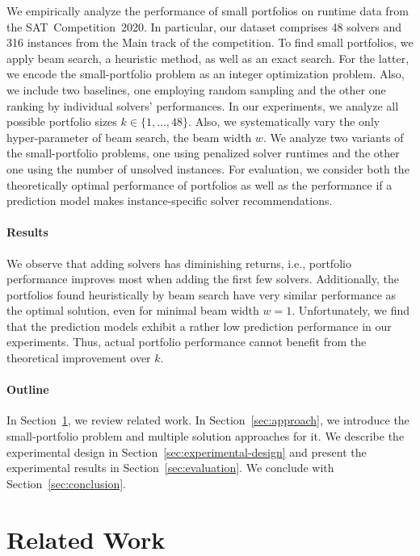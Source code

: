 \documentclass[conference]{IEEEtran}
\begin{document}
We empirically analyze the performance of small portfolios on runtime data from the SAT~Competition~2020. 
In particular, our dataset comprises 48 solvers and 316 instances from the Main track of the competition.
To find small portfolios, we apply beam search, a heuristic method, as well as an exact search. 
For the latter, we encode the small-portfolio problem as an integer optimization problem. 
Also, we include two baselines, one employing random sampling and the other one ranking by individual solvers' performances.
In our experiments, we analyze all possible portfolio sizes $k \in \{1, \dots, 48\}$. 
Also, we systematically vary the only hyper-parameter of beam search, the beam width $w$.
We analyze two variants of the small-portfolio problems, one using penalized solver runtimes and the other one using the number of unsolved instances. 
For evaluation, we consider both the theoretically optimal performance of portfolios as well as the performance if a prediction model makes instance-specific solver recommendations. 

\paragraph{Results}

We observe that adding solvers has diminishing returns, i.e., portfolio performance improves most when adding the first few solvers. 
Additionally, the portfolios found heuristically by beam search have very similar performance as the optimal solution, even for minimal beam width $w=1$.
Unfortunately, we find that the prediction models exhibit a rather low prediction performance in our experiments. 
Thus, actual portfolio performance cannot benefit from the theoretical improvement over $k$. 

\paragraph{Outline}

In Section~\ref{sec:related-work}, we review related work. 
In Section~\ref{sec:approach}, we introduce the small-portfolio problem and multiple solution approaches for it. 
We describe the experimental design in Section~\ref{sec:experimental-design} and present the experimental results in Section~\ref{sec:evaluation}. 
We conclude with Section~\ref{sec:conclusion}. 

\section{Related Work}
\label{sec:related-work}
\end{document}

